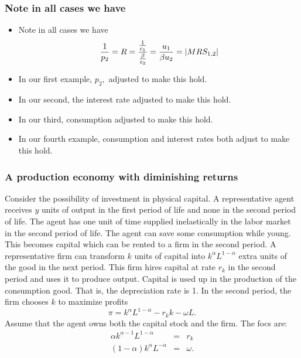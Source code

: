 \documentclass[aspectratio=169]{ltx-talk}
\begin{document}
\begin{frame}
\frametitle{Note in all cases we have}
\begin{itemize}
\item Note in all cases we have 
\begin{equation*}
\frac{1}{p_{2}}=R=\frac{\frac{1}{c_{1}}}{\frac{\beta }{c_{2}}}=\frac{u_{1}}{%
\beta u_{2}}=\left\vert MRS_{1,2}\right\vert
\end{equation*}

\item In our first example, $p_{2},$ adjusted to make this hold.

\item In our second, the interest rate adjusted to make this hold.

\item In our third, consumption adjusted to make this hold.

\item In our fourth example, consumption and interest rates both adjust to
make this hold.
\end{itemize}
\end{frame}

\begin{frame}
\frametitle{A production economy with diminishing returns}
Consider the possibility of investment in physical capital. A representative
agent receives $y$ units of output in the first period of life and none in
the second period of life. The agent has one unit of time supplied
inelastically in the labor market in the second period of life. The agent
can save some consumption while young. This becomes capital which can be
rented to a firm in the second period. A representative firm can transform $%
k $ units of capital into $k^{\alpha }L^{1-\alpha }$ extra units of the good
in the next period. This firm hires capital at rate $r_{k}$ in the second
period and uses it to produce output. Capital is used up in the production
of the consumption good. That is, the depreciation rate is 1. In the second
period, the firm chooses $k$ to maximize profits%
\begin{equation*}
\pi =k^{\alpha }L^{1-\alpha }-r_{k}k-\omega L.
\end{equation*}%
Assume that the agent owns both the capital stock and the firm. The focs are:%
\begin{eqnarray*}
\alpha k^{\alpha -1}L^{1-\alpha } &=&r_{k} \\
\left( 1-\alpha \right) k^{\alpha }L^{-\alpha } &=&\omega .
\end{eqnarray*}%
\end{frame}
\end{document}
